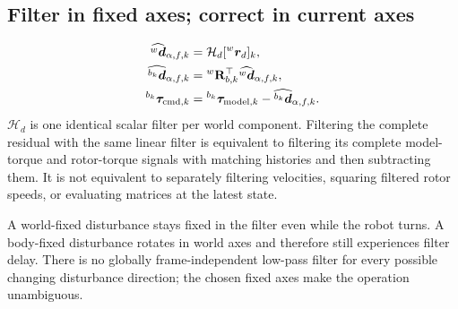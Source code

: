 \documentclass[11pt,a4paper]{article}
\newcommand{\vct}[1]{\boldsymbol{#1}}
\newcommand{\mat}[1]{\mathbf{#1}}
\newcommand{\wv}[1]{{}^{w}\vct{#1}}
\newcommand{\Rk}[1]{{}^{w}\mat R_{b,#1}}
\begin{document}
\subsection{Filter in fixed axes; correct in current axes}
\begin{equation}
\begin{aligned}
\widehat{\wv d}_{\alpha,f,k}&=\mathcal H_d[\wv r_d]_k,\\
\widehat{{}^{b_k}\vct d}_{\alpha,f,k}&=\Rk{k}^\top\widehat{\wv d}_{\alpha,f,k},\\
{}^{b_k}\vct\tau_{{\rm cmd},k}&={}^{b_k}\vct\tau_{{\rm model},k}
-\widehat{{}^{b_k}\vct d}_{\alpha,f,k}.
\end{aligned}
\label{eq:discretecorrection}
\end{equation}
$\mathcal H_d$ is one identical scalar filter per world component. Filtering the
complete residual with the same linear filter is equivalent to filtering its
complete model-torque and rotor-torque signals with matching histories and then
subtracting them. It is not equivalent to separately filtering velocities,
squaring filtered rotor speeds, or evaluating matrices at the latest state.

A world-fixed disturbance stays fixed in the filter even while the robot turns.
A body-fixed disturbance rotates in world axes and therefore still experiences
filter delay. There is no globally frame-independent low-pass filter for every
possible changing disturbance direction; the chosen fixed axes make the
operation unambiguous.
\end{document}

